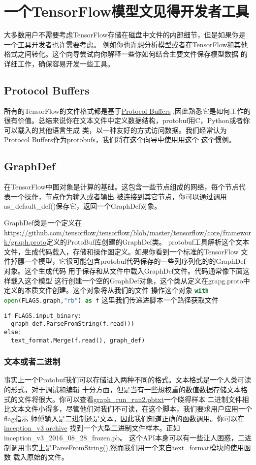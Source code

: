 \section{一个TensorFlow模型文见得开发者工具}
大多数用户不需要考虑TensorFlow存储在磁盘中文件的内部细节，但是如果你是一个工具开发者也许需要考虑。
例如你也许想分析模型或者在TensorFlow和其他格式之间转化。这个向导尝试向你解释一些你如何结合主要文件保存模型数据
的详细工作，确保容易开发一些工具。
\subsection{Protocol Buffers}
所有的TensorFlow的文件格式都是基于\href{https://developers.google.com/protocol-buffers/?hl=en}{Protocol Buffers}
,因此熟悉它是如何工作的很有价值。总结来说你在文本文件中定义数据结构，protobuf用C，Python或者你可以载入的其他语言生成
类，以一种友好的方式访问数据。我们经常认为Protocol Buffers作为protobufs，我们将在这个向导中使用用这个
这个惯例。
\subsection{GraphDef}
在TensorFlow中图对象是计算的基础。这包含一些节点组成的网络，每个节点代表一个操作，节点作为输入或者输出
被连接到其它节点，你可以通过调用as\_default\_def()保存它，返回一个GraphDef对象。

GraphDef类是一个定义在\href{tensorflow/core/framework/graph.proto}{https://github.com/tensorflow/tensorflow/blob/master/tensorflow/core/framework/graph.proto}定义的ProtoBuf库创建的GraphDef类。
protobuf工具解析这个文本文件，生成代码载入，存储和操作图定义。如果你看到一个标准的TensorFlow
文件掉膘一个模型，它很可能包含protobuf代码保存的一些列序列化的的GraphDef对象。这个生成代码
用于保存和从文件中载入GraphDef文件。代码通常像下面这样载入这个模型
这行创建一个空的GraphDef对象，这个类从定义在grapg.proto中定义的本质文件创建。这个对象将从我们的文件
操作这个对象
\lstinline[language=Python]{with open(FLAGS.graph,"rb") as f}
这里我们传递进脚本一个路径获取文件
\begin{lstlisting}[language]
if FLAGS.input_binary:
  graph_def.ParseFromString(f.read())
else:
  text_format.Merge(f.read(), graph_def)
\end{lstlisting}
\subsubsection{文本或者二进制}
事实上一个Protobuf我们可以存储进入两种不同的格式。文本格式是一个人类可读的形式，对于调试和编辑
十分方面，但是当有一些想权重的数值数据存储文本格式的文件将很大。你可以查看\href{https://github.com/tensorflow/tensorboard/blob/master/tensorboard/demo/data/graph_run_run2.pbtxt}{graph\_run_run2.pbtxt}一个晓得样本
二进制文件相比文本文件小得多，尽管他们对我们不可读，在这个脚本，我们要求用户应用一个flag指示
师傅输入是二进制还是文本，因此我们知道正确的函数调用。你可以在\href{https://storage.googleapis.com/download.tensorflow.org/models/inception_v3_2016_08_28_frozen.pb.tar.gz}{inception\_v3 archive}
找到一个大型二进制文件样本。正如inception\_v3\_2016\_08\_28\_frozen.pb。
这个API本身可以有一些让人困惑，二进制调用事实上是ParseFromString(),然而我们用一个来自text\_format模块的使用函数
载入原始的文件。
